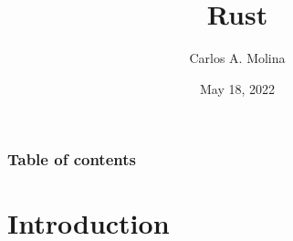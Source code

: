 \documentclass{beamer}
\title[Rust]{Rust} %
\author{Carlos A. Molina}
\date{May 18, 2022}
\begin{document}
\begin{frame}
\titlepage %
\end{frame}

\begin{frame}
\frametitle{Table of contents}
\tableofcontents %
\end{frame}


\section{Introduction} %
\end{document}
